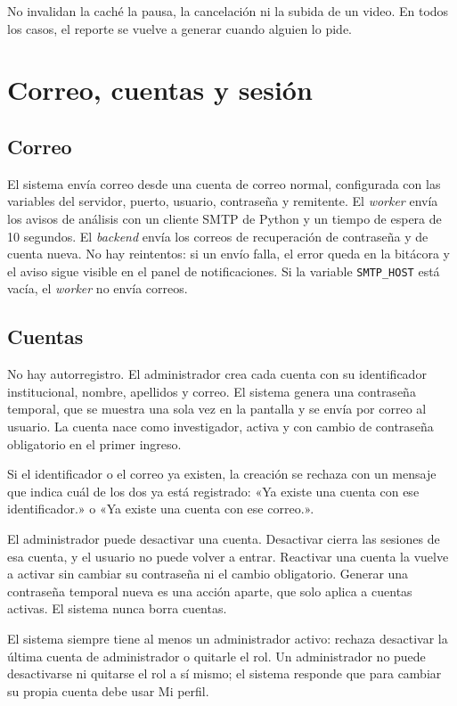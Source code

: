 No invalidan la caché la pausa, la cancelación ni la subida de un video. En todos los casos, el reporte se vuelve a
generar cuando alguien lo pide.

\section{Correo, cuentas y sesión}
\label{sec:correo}

\subsection{Correo}

El sistema envía correo desde una cuenta de correo normal, configurada con las variables del servidor, puerto,
usuario, contraseña y remitente. El \textit{worker} envía los avisos de análisis con un cliente SMTP de Python y un
tiempo de espera de 10 segundos. El \textit{backend} envía los correos de recuperación de contraseña y de cuenta nueva.
No hay reintentos: si un envío falla, el error queda en la bitácora y el aviso sigue visible en el panel de
notificaciones. Si la variable \texttt{SMTP\_HOST} está vacía, el \textit{worker} no envía correos.

\subsection{Cuentas}

No hay autorregistro. El administrador crea cada cuenta con su identificador institucional, nombre, apellidos y
correo. El sistema genera una contraseña temporal, que se muestra una sola vez en la pantalla y se envía por correo
al usuario. La cuenta nace como investigador, activa y con cambio de contraseña obligatorio en el primer ingreso.

Si el identificador o el correo ya existen, la creación se rechaza con un mensaje que indica cuál de los dos ya está
registrado: «Ya existe una cuenta con ese identificador.» o «Ya existe una cuenta con ese correo.».

El administrador puede desactivar una cuenta. Desactivar cierra las sesiones de esa cuenta, y el usuario no puede
volver a entrar. Reactivar una cuenta la vuelve a activar sin cambiar su contraseña ni el cambio obligatorio. Generar
una contraseña temporal nueva es una acción aparte, que solo aplica a cuentas activas. El sistema nunca borra cuentas.

El sistema siempre tiene al menos un administrador activo: rechaza desactivar la última cuenta de administrador o
quitarle el rol. Un administrador no puede desactivarse ni quitarse el rol a sí mismo; el sistema responde que para
cambiar su propia cuenta debe usar Mi perfil.

